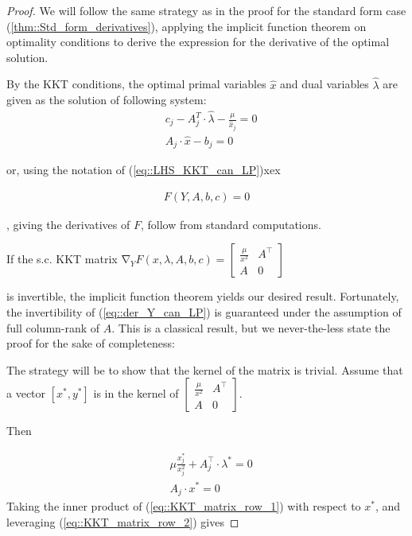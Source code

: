 \documentclass[12pt]{article}
\DeclareMathOperator{\grad}{\mathop{\nabla}}
\newcommand{\dotprod}[2]{#1\mathbin{\cdot}#2}
\newcommand{\br}[1]{\left[ #1 \right]}
\begin{document}
\begin{proof}
We will follow the same strategy as in the proof for the standard form case (\ref{thm::Std_form_derivatives}), applying 
the implicit function theorem on optimality conditions to derive the expression for the derivative of the optimal solution.

By the KKT conditions, the optimal primal variables $\hat{x}$ and dual variables
$\hat{\lambda}$ are given as the solution of following system:
\begin{subequations}
    \label{eq:: KKT_Canonical_form_LP}
\begin{align}
    \label{eq:: KKT_Canonical_form_LP_primal}
& c_j - \dotprod{A^T_j}{\hat{\lambda}} - \frac{\mu}{\hat{x}_j} = 0 \\
    \label{eq:: KKT_Canonical_form_LP_dual}
& \dotprod{A_j}{\hat{x}} - b_j = 0
\end{align}
\end{subequations}

or, using the notation of (\ref{eq::LHS_KKT_can_LP})xex

\begin{align}
    \label{eq::F_form_KKT_can_form_LP}
    F(Y, A, b, c) = 0
\end{align}

, giving the derivatives of $F$, follow from standard computations. 

If the s.c. KKT matrix $\grad_Y F(x, \lambda, A, b, c) =
    \begin{bmatrix}
    \frac{\mu}{x^2} & A^\top \\
    A & 0
    \end{bmatrix}$

is invertible, the implicit function theorem yields our desired result.
Fortunately, the invertibility of (\ref{eq::der_Y_can_LP}) is guaranteed under the
assumption of full column-rank of $A$. This is a classical result, but we never-the-less state the proof for the sake of completeness:

The strategy will be to show that the kernel of the matrix is trivial.
Assume that a vector $\br{x^*, y^*}$ is in the kernel of 
$\begin{bmatrix}
    \frac{\mu}{x^2} & A^\top \\
    A & 0
    \end{bmatrix}$.

    Then 

\begin{subequations}
\begin{align}
    \label{eq::KKT_matrix_row_1}
    &\mu\frac{x^*_j}{x_j^2} + \dotprod{A^\top_j}{\lambda^*} = 0 \\
    \label{eq::KKT_matrix_row_2}
    &\dotprod{A_j}{x^*} = 0
\end{align}
\end{subequations}
Taking the inner product of (\ref{eq::KKT_matrix_row_1}) with respect to $x^*$, and leveraging (\ref{eq::KKT_matrix_row_2}) gives 


\end{proof}
\end{document}

